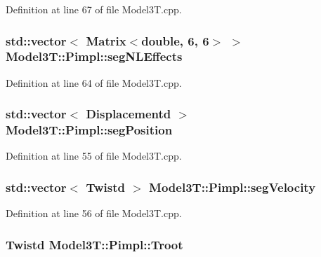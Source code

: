 Definition at line 67 of file Model3\+T.\+cpp.

\subsubsection[{\texorpdfstring{seg\+N\+L\+Effects}{segNLEffects}}]{\setlength{\rightskip}{0pt plus 5cm}std\+::vector$<$ Matrix$<$double, 6, 6$>$ $>$ Model3\+T\+::\+Pimpl\+::seg\+N\+L\+Effects}\hypertarget{structModel3T_1_1Pimpl_a13b0782e9a8fb952f2fa33227277102f}{}\label{structModel3T_1_1Pimpl_a13b0782e9a8fb952f2fa33227277102f}


Definition at line 64 of file Model3\+T.\+cpp.

\subsubsection[{\texorpdfstring{seg\+Position}{segPosition}}]{\setlength{\rightskip}{0pt plus 5cm}std\+::vector$<$ Displacementd $>$ Model3\+T\+::\+Pimpl\+::seg\+Position}\hypertarget{structModel3T_1_1Pimpl_a95a2564c9002bdb208279d591fca70ad}{}\label{structModel3T_1_1Pimpl_a95a2564c9002bdb208279d591fca70ad}


Definition at line 55 of file Model3\+T.\+cpp.

\subsubsection[{\texorpdfstring{seg\+Velocity}{segVelocity}}]{\setlength{\rightskip}{0pt plus 5cm}std\+::vector$<$ Twistd $>$ Model3\+T\+::\+Pimpl\+::seg\+Velocity}\hypertarget{structModel3T_1_1Pimpl_a53fc477028c2bc87ee7c5e04879e8c20}{}\label{structModel3T_1_1Pimpl_a53fc477028c2bc87ee7c5e04879e8c20}


Definition at line 56 of file Model3\+T.\+cpp.

\subsubsection[{\texorpdfstring{Troot}{Troot}}]{\setlength{\rightskip}{0pt plus 5cm}Twistd Model3\+T\+::\+Pimpl\+::\+Troot}\hypertarget{structModel3T_1_1Pimpl_a5b282557f05769af0f2e60709d348a43}{}\label{structModel3T_1_1Pimpl_a5b282557f05769af0f2e60709d348a43}


